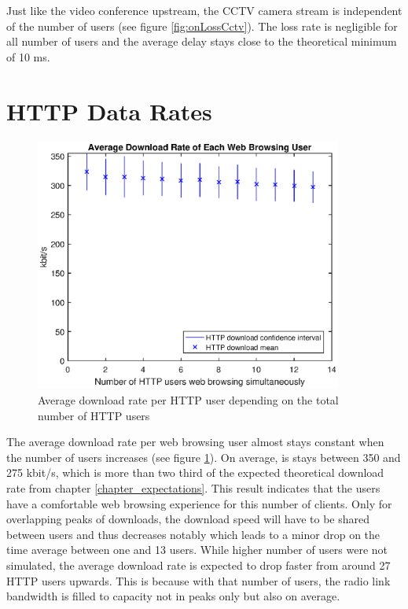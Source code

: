 \documentclass[a4paper,10pt]{book}\usepackage{graphicx}
\begin{document}
Just like the video conference upstream, the CCTV camera stream is independent of the number of users (see figure \ref{fig:onLossCctv}). The loss rate is negligible for all number of users and the average delay stays close to the theoretical minimum of 10 ms.

\section{HTTP Data Rates}
\begin{figure}[!ht]
  \begin{center}
    \includegraphics[width=0.9\textwidth]{on_http_download.eps}
    \caption{Average download rate per HTTP user depending on the total number of HTTP users}
    \label{fig:onHttpDownload}
    \end{center}
\end{figure}

The average download rate per web browsing user almost stays constant when the number of users increases (see figure \ref{fig:onHttpDownload}). On average, is stays between 350 and 275 kbit/s, which is more than two third of the expected theoretical download rate from chapter \ref{chapter_expectations}. This result indicates that the users have a comfortable web browsing experience for this number of clients. Only for overlapping peaks of downloads, the download speed will have to be shared between users and thus decreases notably which leads to a minor drop on the time average between one and 13 users. While higher number of users were not simulated, the average download rate is expected to drop faster from around 27 HTTP users upwards. This is because with that number of users, the radio link bandwidth is filled to capacity not in peaks only but also on average.
\end{document}

